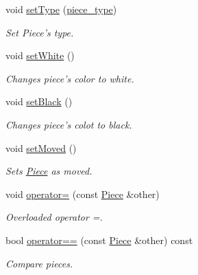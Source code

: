 \begin{DoxyCompactItemize}
void \hyperlink{classChEngn_1_1Piece_a4b66b79da54172c50072df90fae47b3e}{setType} (\hyperlink{namespaceChEngn_a2a35c185f259757a78e937575b8ed483}{piece\_\-type})
\begin{DoxyCompactList}\small\item\em Set Piece's type. \item\end{DoxyCompactList}\item 
\hypertarget{classChEngn_1_1Piece_a93b4da88b5b3bd52c025895ea9296b42}{
void \hyperlink{classChEngn_1_1Piece_a93b4da88b5b3bd52c025895ea9296b42}{setWhite} ()}
\label{classChEngn_1_1Piece_a93b4da88b5b3bd52c025895ea9296b42}

\begin{DoxyCompactList}\small\item\em Changes piece's color to white. \item\end{DoxyCompactList}\item 
\hypertarget{classChEngn_1_1Piece_a28f4d2b27bebe4cf45a9a44aeaaf1f93}{
void \hyperlink{classChEngn_1_1Piece_a28f4d2b27bebe4cf45a9a44aeaaf1f93}{setBlack} ()}
\label{classChEngn_1_1Piece_a28f4d2b27bebe4cf45a9a44aeaaf1f93}

\begin{DoxyCompactList}\small\item\em Changes piece's colot to black. \item\end{DoxyCompactList}\item 
void \hyperlink{classChEngn_1_1Piece_a49e68ef199415d60ea2a394501a52f5a}{setMoved} ()
\begin{DoxyCompactList}\small\item\em Sets \hyperlink{classChEngn_1_1Piece}{Piece} as moved. \item\end{DoxyCompactList}\item 
void \hyperlink{classChEngn_1_1Piece_a8142dd8313cf7ea1ded23af47fc45532}{operator=} (const \hyperlink{classChEngn_1_1Piece}{Piece} \&other)
\begin{DoxyCompactList}\small\item\em Overloaded operator =. \item\end{DoxyCompactList}\item 
bool \hyperlink{classChEngn_1_1Piece_a6b6b6e455671ac4f3f9996ef31602a13}{operator==} (const \hyperlink{classChEngn_1_1Piece}{Piece} \&other) const 
\begin{DoxyCompactList}\small\item\em Compare pieces. \item\end{DoxyCompactList}\end{DoxyCompactItemize}
